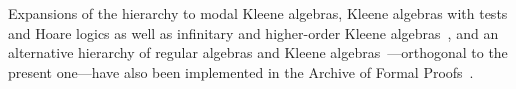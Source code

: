 \documentclass[11pt,a4paper]{article}
\begin{document}
Expansions of the hierarchy to modal Kleene algebras, Kleene algebras
with tests and Hoare logics as well as infinitary and higher-order
Kleene
algebras~\cite{guttmannstruthweber11algmeth,armstrongstruth12hoka},
and an alternative hierarchy of regular algebras and Kleene
algebras~\cite{fosterstruth12regalg}---orthogonal to the present
one---have also been implemented in the Archive of Formal
Proofs~\cite{regalg,kad,kat,rel}.





\end{document}
